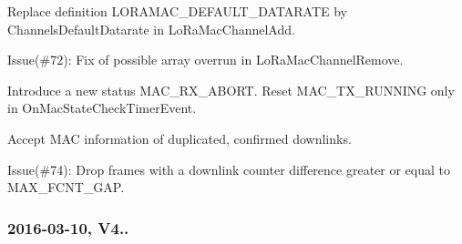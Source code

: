 \begin{DoxyItemize}
\begin{DoxyEnumerate}
\item Replace definition L\+O\+R\+A\+M\+A\+C\+\_\+\+D\+E\+F\+A\+U\+L\+T\+\_\+\+D\+A\+T\+A\+R\+A\+TE by Channels\+Default\+Datarate in Lo\+Ra\+Mac\+Channel\+Add.
\item Issue(\#72)\+: Fix of possible array overrun in Lo\+Ra\+Mac\+Channel\+Remove.
\item Introduce a new status M\+A\+C\+\_\+\+R\+X\+\_\+\+A\+B\+O\+RT. Reset M\+A\+C\+\_\+\+T\+X\+\_\+\+R\+U\+N\+N\+I\+NG only in On\+Mac\+State\+Check\+Timer\+Event.
\item Accept M\+AC information of duplicated, confirmed downlinks.
\item Issue(\#74)\+: Drop frames with a downlink counter difference greater or equal to M\+A\+X\+\_\+\+F\+C\+N\+T\+\_\+\+G\+AP.
\end{DoxyEnumerate}
\end{DoxyItemize}

\subsubsection*{2016-\/03-\/10, V4..}


